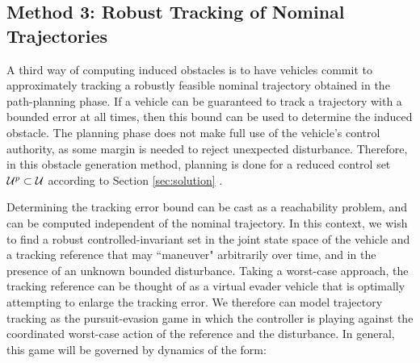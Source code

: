 \subsection{Method 3: Robust Tracking of Nominal Trajectories \label{sec:rtt}}
A third way of computing induced obstacles is to have vehicles commit to approximately tracking a robustly feasible nominal trajectory obtained in the path-planning phase. If a vehicle can be guaranteed to track a trajectory with a bounded error at all times, then this bound can be used to determine the induced obstacle. The planning phase does not make full use of the vehicle's control authority, as some margin is needed to reject unexpected disturbance. Therefore, in this obstacle generation method, planning is done for a reduced control set $\mathcal{U}^p\subset\mathcal{U}$ according to Section \ref{sec:solution} .


Determining the tracking error bound can be cast as a reachability problem, and can be computed independent of the nominal trajectory. In this context, we wish to find a robust controlled-invariant set in the joint state space of the vehicle and a tracking reference that may ``maneuver" arbitrarily over time, and in the presence of an unknown bounded disturbance. Taking a worst-case approach, the tracking reference can be thought of as a virtual evader vehicle that is optimally attempting to enlarge the tracking error. We therefore can model trajectory tracking as the pursuit-evasion game in which the controller is playing against the coordinated worst-case action of the reference and the disturbance. In general, this game will be governed by dynamics of the form:

